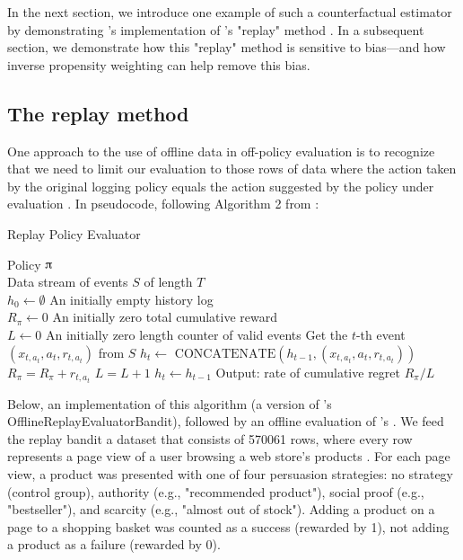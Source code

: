 \documentclass{jss}
\begin{document}
In the next section, we introduce one example of such a counterfactual estimator by demonstrating 's implementation of \cite{Li2011}'s "replay" method \citep{Nicol2014}. In a subsequent section, we demonstrate how this "replay" method is sensitive to bias---and how inverse propensity weighting can help remove this bias.

\subsection{The replay method} \label{offli}

One approach to the use of offline data in off-policy evaluation is to recognize that we need to limit our evaluation to those rows of data where the action taken by the original logging policy equals the action suggested by the policy under evaluation \citep{Li2012,Li2011}. In pseudocode, following Algorithm 2 from \cite{Li2011}:

\begin{algorithm}[H]
\caption{Replay Policy Evaluator}
\label{Alg:LiBandit}
\begin{algorithmic}
\REQUIRE  Policy $\piup$ \\
                 Data stream of events $S$ of length $T$  \\
                 $h_0 \leftarrow \emptyset$ {An initially empty history log}\\
                 $R_\pi \leftarrow 0$ {An initially zero total cumulative reward}\\
                 $L \leftarrow 0$ {An initially zero length counter of valid events}
	\STATE Get the $t$-th event \( (x_{t,a_t},a_{t},r_{t,a_t}) \) from  $S$
	       \STATE $h_{t} \leftarrow $  \(\textrm{CONCATENATE}\left( h_{t-1},(x_{t,a_t},a_{t},r_{t,a_t})  \right)\)
	       \STATE $R_\pi = R_\pi + r_{t,a_t}$
	       \STATE $L = L + 1$
	\ELSE
	        \STATE $h_{t} \leftarrow  h_{t-1} $
	\ENDIF
\ENDFOR
\STATE Output: rate of cumulative regret $R_\pi / L $
\end{algorithmic}
\end{algorithm}

Below, an implementation of this algorithm (a version of 's  OfflineReplayEvaluatorBandit), followed by an offline evaluation of 's . We feed the replay bandit a dataset that consists of 570061 rows, where every row represents a page view of a user browsing a web store's products \citep{Kaptein2018}. For each page view, a product was presented with one of four persuasion strategies: no strategy (control group), authority (e.g., "recommended product"), social proof (e.g., "bestseller"), and scarcity (e.g., "almost out of stock"). Adding a product on a page to a shopping basket was counted as a success (rewarded by 1), not adding a product as a failure (rewarded by 0).
\end{document}
